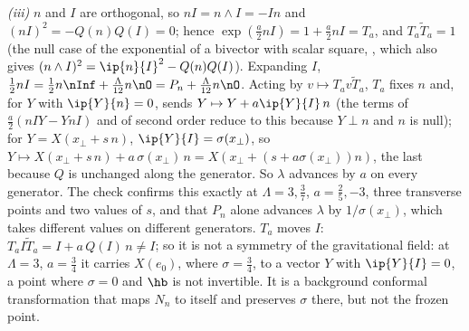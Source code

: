 \emph{(iii)} $n$ and $I$ are orthogonal, so $nI = n \wedge I = -In$ and $(nI)^{2} = -Q(n)Q(I) = 0$; hence $\exp(\tfrac{a}{2}nI) = 1 + \tfrac{a}{2}nI = T_{a}$, and $T_{a}\tilde T_{a} = 1$ (the null case of the exponential of a bivector with scalar square, , which also gives $(n \wedge I)^{2} = \ip{n}{I}^{2} - Q(n)Q(I)$). Expanding $I$, $\tfrac12 nI = \tfrac12 n\nInf + \tfrac{\Lambda}{12}n\nO = P_{n} + \tfrac{\Lambda}{12}n\nO$. Acting by $v \mapsto T_{a}v\tilde T_{a}$, $T_{a}$ fixes $n$ and, for $Y$ with $\ip{Y}{n} = 0$, sends $Y \mapsto Y + a\ip{Y}{I}\,n$ (the terms of $\tfrac{a}{2}(nIY - YnI)$ and of second order reduce to this because $Y \perp n$ and $n$ is null); for $Y = X(x_{\perp} + s\,n)$, $\ip{Y}{I} = \sigma(x_{\perp})$, so $Y \mapsto X(x_{\perp} + s\,n) + a\,\sigma(x_{\perp})\,n = X(x_{\perp} + (s + a\sigma(x_{\perp}))n)$, the last because $Q$ is unchanged along the generator. So $\lambda$ advances by $a$ on every generator. The check confirms this exactly at $\Lambda = 3, \tfrac37$, $a = \tfrac25, -3$, three transverse points and two values of $s$, and that $P_{n}$ alone advances $\lambda$ by $1/\sigma(x_{\perp})$, which takes different values on different generators. $T_{a}$ moves $I$: $T_{a}I\tilde T_{a} = I + a\,Q(I)\,n \ne I$; so it is not a symmetry of the gravitational field: at $\Lambda = 3$, $a = \tfrac34$ it carries $X(e_{0})$, where $\sigma = \tfrac34$, to a vector $Y$ with $\ip{Y}{I} = 0$, a point where $\sigma = 0$ and $\hb$ is not invertible. It is a background conformal transformation that maps $N_{n}$ to itself and preserves $\sigma$ there, but not the frozen point.

